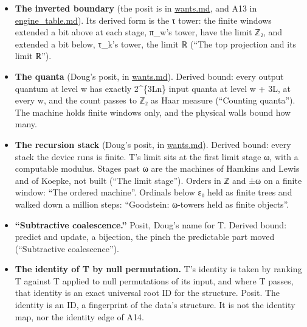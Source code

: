 \begin{itemize}
\begin{itemize}
\item An infinite expansion is not infinite complexity. 1/3 = …10101011 never ends, and a program a few bits long prints any window of it: K(π\_\allowbreak{}w(1/3)) ≤ K(w) + c = O(log w).
\item For a computable x ∈ ℤ₂, K(π\_\allowbreak{}w(x)) ≤ K(x) + O(log w): run x's program to w digits, given w.
\item Haar-almost every element of ℤ₂ is Martin-Löf random (Martin-Löf 1966~\cite{src:Martin-L-f-1966}). The Haar measure on ℤ₂ is the fair coin on its digits, and the random sequences have measure 1. A random element is not computable.
\item The machine reaches finite windows only. Every register is π\_\allowbreak{}w of something, and any w-bit window has K ≤ w + O(log w). Every constant in a program is a finite description, and the machine's reach is the windows of computable elements.
\item “Infinitely complex” can name only a limit object the machine never holds whole. Which object the anchors are, and whether they are random elements of ℤ₂, is open. “Bending the information field” has no definition here to derive from.
\end{itemize}
\item \textbf{The inverted boundary} (the posit is in \hyperref[chap:wants]{wants.md}, and A13 in \hyperref[chap:engine-table]{engine\_\allowbreak{}table.md}). Its derived form is the τ tower: the finite windows extended a bit above at each stage, π\_\allowbreak{}w's tower, have the limit ℤ₂, and extended a bit below, τ\_\allowbreak{}k's tower, the limit ℝ (“The top projection and its limit ℝ”).
\item \textbf{The quanta} (Doug's posit, in \hyperref[chap:wants]{wants.md}). Derived bound: every output quantum at level w has exactly 2\textasciicircum{}\{3Ln\} input quanta at level w + 3L, at every w, and the count passes to ℤ₂ as Haar measure (“Counting quanta”). The machine holds finite windows only, and the physical walls bound how many.
\item \textbf{The recursion stack} (Doug's posit, in \hyperref[chap:wants]{wants.md}). Derived bound: every stack the device runs is finite. T's limit sits at the first limit stage ω, with a computable modulus. Stages past ω are the machines of Hamkins and Lewis and of Koepke, not built (“The limit stage”). Orders in ℤ and ±ω on a finite window: “The ordered machine”. Ordinals below ε₀ held as finite trees and walked down a million steps: “Goodstein: ω-towers held as finite objects”.
\item \textbf{“Subtractive coalescence.”} Posit, Doug's name for T. Derived bound: predict and update, a bijection, the pinch the predictable part moved (“Subtractive coalescence”).
\item \textbf{The identity of T by null permutation.} T's identity is taken by ranking T against T applied to null permutations of its input, and where T passes, that identity is an exact universal root ID for the structure. Posit. The identity is an ID, a fingerprint of the data's structure. It is not the identity map, nor the identity edge of A14.


\end{itemize}
